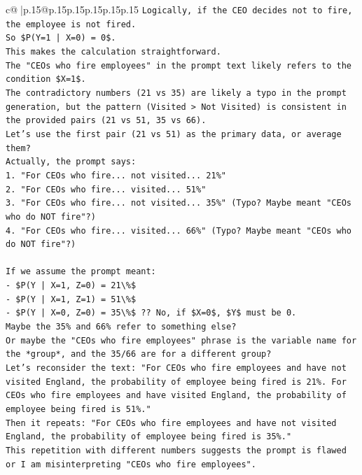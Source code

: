 \documentclass{article}
\begin{document}
{\begin{supertabular}{c@{$\;$}|p{.15\linewidth}@{}p{.15\linewidth}p{.15\linewidth}p{.15\linewidth}p{.15\linewidth}p{.15\linewidth}}
{{{\texttt{Logically, if the CEO decides not to fire, the employee is not fired.} \\
\texttt{So \$P(Y=1 | X=0) = 0\$.} \\
\texttt{This makes the calculation straightforward.} \\
\texttt{The "CEOs who fire employees" in the prompt text likely refers to the condition \$X=1\$.} \\
\texttt{The contradictory numbers (21 vs 35) are likely a typo in the prompt generation, but the pattern (Visited > Not Visited) is consistent in the provided pairs (21 vs 51, 35 vs 66).} \\
\texttt{Let's use the first pair (21 vs 51) as the primary data, or average them?} \\
\texttt{Actually, the prompt says:} \\
\texttt{1. "For CEOs who fire... not visited... 21\%"} \\
\texttt{2. "For CEOs who fire... visited... 51\%"} \\
\texttt{3. "For CEOs who fire... not visited... 35\%" (Typo? Maybe meant "CEOs who do NOT fire"?)} \\
\texttt{4. "For CEOs who fire... visited... 66\%" (Typo? Maybe meant "CEOs who do NOT fire"?)} \\
\\ 
\texttt{If we assume the prompt meant:} \\
\texttt{{-} \$P(Y | X=1, Z=0) = 21\textbackslash{}\%\$} \\
\texttt{{-} \$P(Y | X=1, Z=1) = 51\textbackslash{}\%\$} \\
\texttt{{-} \$P(Y | X=0, Z=0) = 35\textbackslash{}\%\$ ?? No, if \$X=0\$, \$Y\$ must be 0.} \\
\texttt{Maybe the 35\% and 66\% refer to something else?} \\
\texttt{Or maybe the "CEOs who fire employees" phrase is the variable name for the *group*, and the 35/66 are for a different group?} \\
\texttt{Let's reconsider the text: "For CEOs who fire employees and have not visited England, the probability of employee being fired is 21\%. For CEOs who fire employees and have visited England, the probability of employee being fired is 51\%."} \\
\texttt{Then it repeats: "For CEOs who fire employees and have not visited England, the probability of employee being fired is 35\%."} \\
\texttt{This repetition with different numbers suggests the prompt is flawed or I am misinterpreting "CEOs who fire employees".} \\
}}}
\end{supertabular}}
\end{document}
